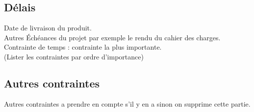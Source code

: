 \documentclass{article}
\begin{document}
	\subsection{Délais}
		Date de livraison du produit.\\
		Autres Échéances du projet par exemple le rendu du cahier des charges.
		Contrainte de temps : contrainte la plus importante.\\
		(Lister les contraintes par ordre d'importance)
	\subsection{Autres contraintes}
		Autres contraintes a prendre en compte s'il y en a sinon on supprime cette partie.
\end{document}
